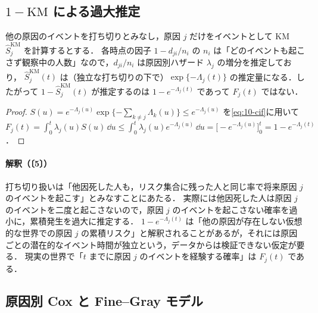 \subsection{\texorpdfstring{$1-\mathrm{KM}$}{1−KM} による過大推定}\label{subsec:10-compete-km}
\Hinshutsu 他の原因のイベントを打ち切りとみなし，原因 $j$ だけをイベントとして KM $\hat S_j^{\mathrm{KM}}$ を計算するとする．
各時点の因子 $1-d_{ji}/n_i$ の $n_i$ は「どのイベントも起こさず観察中の人数」なので，$d_{ji}/n_i$ は原因別ハザード $\lambda_j$ の増分を推定しており，
$\hat S_j^{\mathrm{KM}}(t)$ は（独立な打ち切りの下で）$\exp\{-\Lambda_j(t)\}$ の推定量になる．したがって $1-\hat S_j^{\mathrm{KM}}(t)$ が推定するのは $1-e^{-\Lambda_j(t)}$ であって $F_j(t)$ ではない．
\begin{proof}
$S(u)=e^{-\Lambda_j(u)}\exp\{-\sum_{k\ne j}\Lambda_k(u)\}\le e^{-\Lambda_j(u)}$ を\cref{eq:10-cif}に用いて
$F_j(t)=\int_0^t\lambda_j(u)S(u)\,\dd u\le\int_0^t\lambda_j(u)e^{-\Lambda_j(u)}\,\dd u=\bigl[-e^{-\Lambda_j(u)}\bigr]_0^t=1-e^{-\Lambda_j(t)}$．
\end{proof}
\paragraph{解釈（〔5〕）}
打ち切り扱いは「他因死した人も，リスク集合に残った人と同じ率で将来原因 $j$ のイベントを起こす」とみなすことにあたる．
実際には他因死した人は原因 $j$ のイベントを二度と起こさないので，原因 $j$ のイベントを起こさない確率を過小に，累積発生を過大に推定する．
$1-e^{-\Lambda_j(t)}$ は「他の原因が存在しない仮想的な世界での原因 $j$ の累積リスク」と解釈されることがあるが，それには原因ごとの潜在的なイベント時間が独立という，データからは検証できない仮定が要る．
現実の世界で「$t$ までに原因 $j$ のイベントを経験する確率」は $F_j(t)$ である．

\subsection{原因別 Cox と Fine--Gray モデル}\label{subsec:10-compete-reg}
\Hinshutsu

